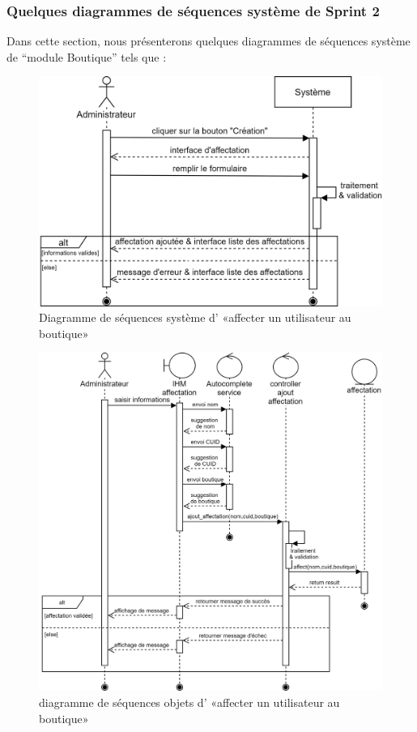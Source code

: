 \subsubsection[Quelques diagrammes de séquences système de Sprint 2]{Quelques diagrammes de séquences système de Sprint 2}
Dans cette section, nous présenterons quelques diagrammes de séquences système de “module Boutique” tels que :
\begin{figure}[H]
	\centering
	\includegraphics[width=0.7\linewidth]{"img/conception/sequences/sprint 2/affectation-system"}
	\caption[Diagramme de séquences système d’ «affecter un utilisateur au boutique»]{Diagramme de séquences système d’ «affecter un utilisateur au boutique»}
	\label{fig:affectation-system}
\end{figure}

\begin{figure}[H]
	\centering
	\includegraphics[width=0.65\linewidth]{"img/conception/sequences/sprint 2/affectation-obj"}
	\caption[diagramme de séquences objets d’ «affecter un utilisateur au boutique»]{diagramme de séquences objets d’ «affecter un utilisateur au boutique»}
	\label{fig:affectation-obj}
\end{figure}

